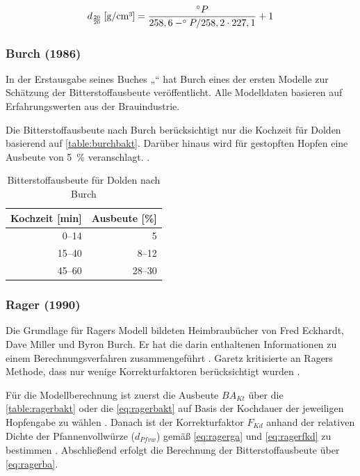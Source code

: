 \documentclass[a4paper,parskip=half]{scrartcl}
\newcommand{\BAKt}{{\mathit{BA}}_{\mathit{Kt}}}
\newcommand{\uden}{\:[\text{g/cm³}]}
\newcommand{\FKd}{F_{\mathit{Kd}}}
\newcommand{\dPfvw}{d_\mathit{Pfvw}}
\begin{document}
\begin{equation}
d_{\frac{20}{20}} \uden = \frac{\degree P}{258,6 - \degree P / 258,2 \cdot 227,1} + 1
\label{eq:calcptosg}
\end{equation}

\subsubsection*{Burch (1986)}

In der Erstausgabe seines Buches „“ hat Burch eines der ersten Modelle zur Schätzung der Bitterstoffausbeute veröffentlicht. Alle Modelldaten basieren auf Erfahrungswerten aus der Brauindustrie. \parencite[28-32]{Burch1992}

Die Bitterstoffausbeute nach Burch berücksichtigt nur die Kochzeit für Dolden basierend auf \autoref{table:burchbakt}. Darüber hinaus wird für gestopften Hopfen eine Ausbeute von 5~\% veranschlagt. \parencite[33]{Burch1992}.

\begin{table}[H]
\centering
\begin{tabular}{rr}
\toprule
\multicolumn{1}{c}{\textbf{Kochzeit [min]}} & \multicolumn{1}{c}{\textbf{Ausbeute [\%]}} \\
\midrule
0–14  & 5 \\
15–40 & 8–12 \\
45–60 & 28–30 \\
\bottomrule
\end{tabular}
\caption{Bitterstoffausbeute für Dolden nach Burch \parencite[33]{Burch1992}}
\label{table:burchbakt}
\end{table}

\subsubsection*{Rager (1990)}

Die Grundlage für Ragers Modell bildeten Heimbraubücher von Fred Eckhardt, Dave Miller und Byron Burch. Er hat die darin enthaltenen Informationen zu einem Berechnungsverfahren zusammengeführt \parencite[53]{Rager1990}. Garetz kritisierte an Ragers Methode, dass nur wenige Korrekturfaktoren berücksichtigt wurden \parencite[134]{Garetz1994}.

Für die Modellberechnung ist zuerst die Ausbeute $\BAKt$ über die \autoref{table:ragerbakt} oder die \autoref{eq:ragerbakt} auf Basis der Kochdauer der jeweiligen Hopfengabe zu wählen \parencite{Steinmeyer2021}. Danach ist der Korrekturfaktor $\FKd$ anhand der relativen Dichte der Pfannenvollwürze ($\dPfvw$) gemäß \autoref{eq:ragerga} und \autoref{eq:ragerfkd} zu bestimmen \parencite[53]{Rager1990}. Abschließend erfolgt die Berechnung der Bitterstoffausbeute über \autoref{eq:ragerba}.
\end{document}
